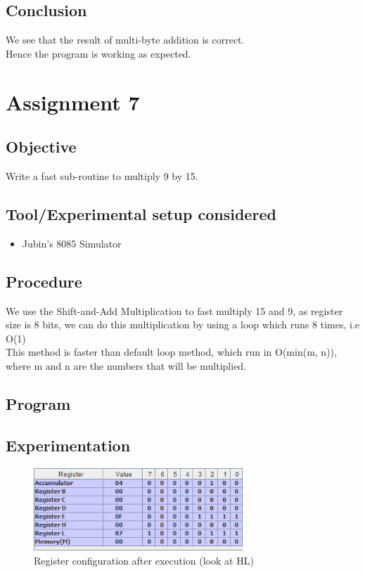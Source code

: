 \documentclass[a4paper]{article} %
\begin{document}
    \subsection{Conclusion}
        We see that the result of multi-byte addition is correct.\\
        Hence the program is working as expected.
\newpage

\section[Fast Multiplication Subroutine]{Assignment 7} %
    \subsection{Objective}
        Write a fast sub-routine to multiply 9 by 15.
    \subsection{Tool/Experimental setup considered}
        \begin{itemize}
            \item Jubin's 8085 Simulator
        \end{itemize}
    \subsection{Procedure}
        We use the Shift-and-Add Multiplication to fast multiply 15 and 9, as register size is 8 bits, we can do this multiplication by using a loop which runs 8 times, i.e O(1)\\
        This method is faster than default loop method, which run in O(min(m, n)), where m and n are the numbers that will be multiplied.
    \subsection{Program}
        
    \subsection{Experimentation}
        \begin{figure}[h!]
            \centering
            \includegraphics[width=0.7\textwidth]{Assignment 3/1_9x15/9x15.png}
            \caption{Register configuration after execution (look at HL)}
            \label{fg6}
        \end{figure}
\end{document}
